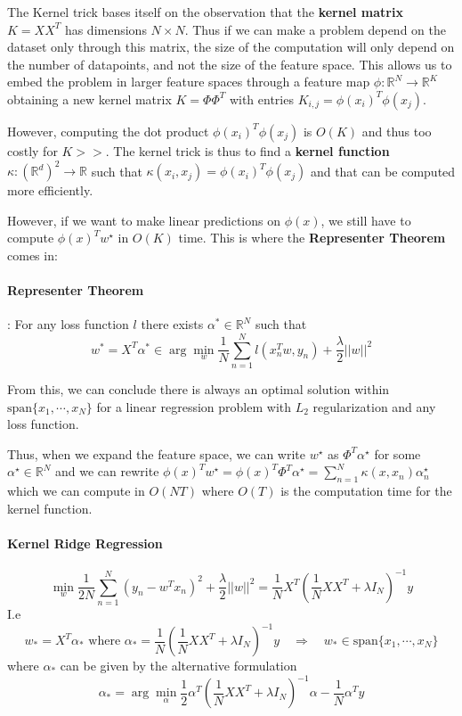 \documentclass{article}
\newcommand{\R}{\mathbb{R}}
\begin{document}
The Kernel trick bases itself on the observation that the \textbf{kernel matrix} $K = X X^T$ has dimensions $N \times N$.
Thus if we can make a problem depend on the dataset only through this matrix, the size of the computation will only depend on the number of datapoints, and not the size of the feature space.
This allows us to embed the problem in larger feature spaces through a feature map $\phi : \R^N \to \R^K$ obtaining a new kernel matrix $K = \Phi \Phi^T$ with entries $K_{i,j} = \phi(x_i)^T \phi(x_j)$.

However, computing the dot product $\phi(x_i)^T \phi(x_j)$ is $O(K)$ and thus too costly for $K >>$.
The kernel trick is thus to find a \textbf{kernel function} $\kappa : (\R^d)^2 \to \R$ such that $\kappa(x_i, x_j) = \phi(x_i)^T \phi(x_j)$ and that can be computed more efficiently.

However, if we want to make linear predictions on $\phi(x)$, we still have to compute $\phi(x)^T w^\star$ in $O(K)$ time.
This is where the \textbf{Representer Theorem} comes in:

\paragraph{Representer Theorem}:
For any loss function $l$ there exists $\alpha^* \in \R^N$ such that
$$
w^* = X^T \alpha^* \in \arg \min_w \frac{1}{N} \sum_{n=1}^N l(x_n^T w, y_n) + \frac{\lambda}{2} ||w||^2
$$

From this, we can conclude there is always an optimal solution within $\text{span} \{ x_1, \cdots, x_N \}$ for a linear regression problem with $L_2$ regularization and any loss function.

Thus, when we expand the feature space, we can write $w^\star$ as $\Phi^T \alpha^\star$ for some $\alpha^\star \in \R^N$ and we can rewrite $\phi(x)^T w^\star = \phi(x)^T \Phi^T \alpha^\star = \sum_{n=1}^N \kappa(x, x_n) \alpha^\star_n$ which we can compute in $O(NT)$ where $O(T)$ is the computation time for the kernel function.

\paragraph{Kernel Ridge Regression}

$$
\min_w \frac{1}{2N} \sum_{n=1}^N (y_n - w^T x_n)^2 + \frac{\lambda}{2}||w||^2 = 
\frac{1}{N} X^T \left( \frac{1}{N} X X^T + \lambda I_N \right)^{-1} y
$$
I.e
$$
w_* = X^T \alpha_* \text{ where } \alpha_* = \frac{1}{N} \left( \frac{1}{N} X X^T + \lambda I_N \right)^{-1} y \quad \Rightarrow \quad
w_* \in \text{span}\{x_1, \cdots, x_N\}
$$
where $\alpha_*$ can be given by the alternative formulation
$$
\alpha_* = \arg \min_\alpha \frac{1}{2} \alpha^T \left( \frac{1}{N} XX^T + \lambda I_N \right)^{-1} \alpha - \frac{1}{N} \alpha^T y
$$
\end{document}
